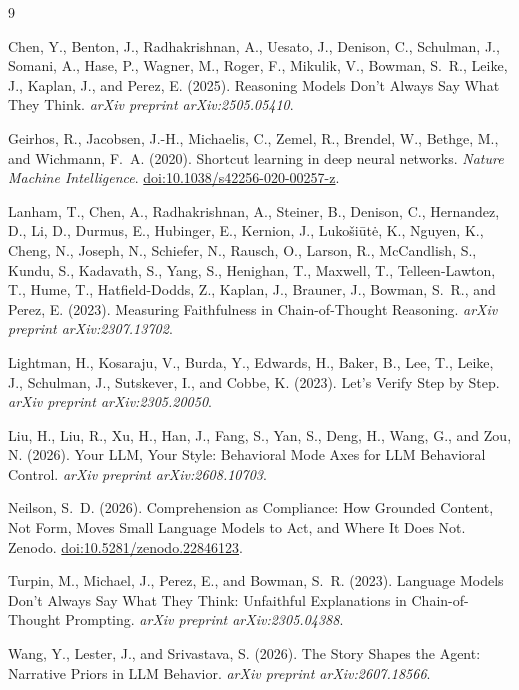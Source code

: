 \documentclass[11pt,a4paper]{article}
\begin{document}
\begin{thebibliography}{9}

Chen, Y., Benton, J., Radhakrishnan, A., Uesato, J., Denison, C., Schulman, J.,
  Somani, A., Hase, P., Wagner, M., Roger, F., Mikulik, V., Bowman, S.~R.,
  Leike, J., Kaplan, J., and Perez, E. (2025).
\newblock Reasoning Models Don't Always Say What They Think.
\newblock \emph{arXiv preprint arXiv:2505.05410}.

Geirhos, R., Jacobsen, J.-H., Michaelis, C., Zemel, R., Brendel, W., Bethge, M.,
  and Wichmann, F.~A. (2020).
\newblock Shortcut learning in deep neural networks.
\newblock \emph{Nature Machine Intelligence}.
  \href{https://doi.org/10.1038/s42256-020-00257-z}{doi:10.1038/s42256-020-00257-z}.

Lanham, T., Chen, A., Radhakrishnan, A., Steiner, B., Denison, C., Hernandez, D.,
  Li, D., Durmus, E., Hubinger, E., Kernion, J., Lukošiūtė, K., Nguyen, K.,
  Cheng, N., Joseph, N., Schiefer, N., Rausch, O., Larson, R., McCandlish, S.,
  Kundu, S., Kadavath, S., Yang, S., Henighan, T., Maxwell, T., Telleen-Lawton, T.,
  Hume, T., Hatfield-Dodds, Z., Kaplan, J., Brauner, J., Bowman, S.~R., and
  Perez, E. (2023).
\newblock Measuring Faithfulness in Chain-of-Thought Reasoning.
\newblock \emph{arXiv preprint arXiv:2307.13702}.

Lightman, H., Kosaraju, V., Burda, Y., Edwards, H., Baker, B., Lee, T., Leike, J.,
  Schulman, J., Sutskever, I., and Cobbe, K. (2023).
\newblock Let's Verify Step by Step.
\newblock \emph{arXiv preprint arXiv:2305.20050}.

Liu, H., Liu, R., Xu, H., Han, J., Fang, S., Yan, S., Deng, H., Wang, G., and
  Zou, N. (2026).
\newblock Your LLM, Your Style: Behavioral Mode Axes for LLM Behavioral Control.
\newblock \emph{arXiv preprint arXiv:2608.10703}.

Neilson, S.~D. (2026).
\newblock Comprehension as Compliance: How Grounded Content, Not Form, Moves
  Small Language Models to Act, and Where It Does Not.
\newblock Zenodo. \href{https://doi.org/10.5281/zenodo.22846123}{doi:10.5281/zenodo.22846123}.

Turpin, M., Michael, J., Perez, E., and Bowman, S.~R. (2023).
\newblock Language Models Don't Always Say What They Think: Unfaithful
  Explanations in Chain-of-Thought Prompting.
\newblock \emph{arXiv preprint arXiv:2305.04388}.

Wang, Y., Lester, J., and Srivastava, S. (2026).
\newblock The Story Shapes the Agent: Narrative Priors in LLM Behavior.
\newblock \emph{arXiv preprint arXiv:2607.18566}.

\end{thebibliography}
\end{document}
